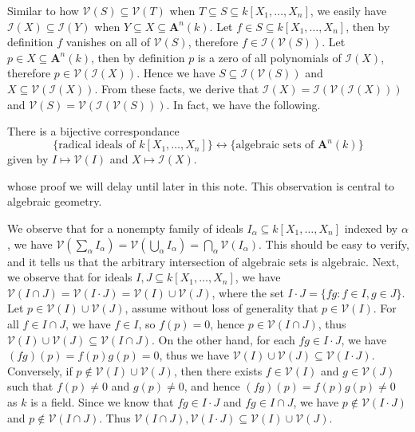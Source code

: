 \documentclass[11pt]{book}
\begin{document}
Similar to how $\mathcal{V}(S)\subseteq \mathcal{V}(T)$ when $T\subseteq S\subseteq k[X_1,\dots,X_n]$, we easily have $\mathcal{I}(X)\subseteq \mathcal{I}(Y)$ when $Y\subseteq X\subseteq \mathbf A^n(k)$. Let $f\in S\subseteq k[X_1,\dots,X_n]$, then by definition $f$ vanishes on all of $\mathcal{V}(S)$, therefore $f\in \mathcal{I}(\mathcal{V}(S))$. Let $p\in X\subseteq \mathbf A^n(k)$, then by definition $p$ is a zero of all polynomials of $\mathcal{I}(X)$, therefore $p\in \mathcal{V}(\mathcal{I}(X))$. Hence we have $S\subseteq \mathcal{I}(\mathcal{V}(S))$ and $X\subseteq \mathcal{V}(\mathcal{I}(X))$. From these facts, we derive that $\mathcal{I}(X)= \mathcal{I}(\mathcal{V}(\mathcal{I}(X)))$ and $\mathcal{V}(S)= \mathcal{V}(\mathcal{I}(\mathcal V(S)))$. In fact, we have the following.
\begin{theorembox}There is a bijective correspondance
\[\{\textrm{radical\ ideals\ of\ }k[X_1,\dots,X_n]\}\longleftrightarrow\{\textrm{algebraic\ sets\ of\ }\mathbf A^n(k)\}\]
given by $I\mapsto \mathcal{V}(I)$ and $X\mapsto \mathcal{I}(X)$.
\end{theorembox}
whose proof we will delay until later in this note. This observation is central to algebraic geometry. 

We observe that for a nonempty family of ideals $I_{\alpha}\subseteq k[X_1,\dots,X_n]$ indexed by $\alpha$, we have $\mathcal{V}(\sum_{\alpha}I_{\alpha})=\mathcal{V}(\bigcup_{\alpha}I_{\alpha})=\bigcap_{\alpha}\mathcal{V}(I_{\alpha})$. This should be easy to verify, and it tells us that the arbitrary intersection of algebraic sets is algebraic. Next, we observe that for ideals $I,J\subseteq k[X_1,\dots,X_n]$, we have $\mathcal{V}(I\cap J)=\mathcal{V}(I\cdot J)=\mathcal{V}(I)\cup \mathcal{V}(J)$, where the set $I\cdot J=\{fg:f\in I,g\in J\}$. Let $p\in \mathcal{V}(I)\cup \mathcal{V}(J)$, assume without loss of generality that $p\in \mathcal{V}(I)$. For all $f\in I\cap J$, we have $f\in I$, so $f(p)=0$, hence $p\in \mathcal{V}(I\cap J)$, thus $\mathcal{V}(I)\cup\mathcal{V}(J)\subseteq \mathcal{V}(I\cap J)$. On the other hand, for each $fg\in I\cdot J$, we have $(fg)(p)=f(p)g(p)=0$, thus we have $\mathcal{V}(I)\cup\mathcal{V}(J)\subseteq \mathcal{V}(I\cdot J)$. Conversely, if $p\not\in \mathcal{V}(I)\cup \mathcal{V}(J)$, then there exists $f\in \mathcal{V}(I)$ and $g\in \mathcal{V}(J)$ such that $f(p)\ne 0$ and $g(p)\ne 0$, and hence $(fg)(p)=f(p)g(p)\ne 0$ as $k$ is a field. Since we know that $fg\in I\cdot J$ and $fg\in I\cap J$, we have $p\not\in \mathcal{V}(I\cdot J)$ and $p\not\in \mathcal{V}(I\cap J)$. Thus $\mathcal{V}(I\cap J),\mathcal{V}(I\cdot J)\subseteq \mathcal{V}(I)\cup\mathcal{V}(J)$.
\end{document}
